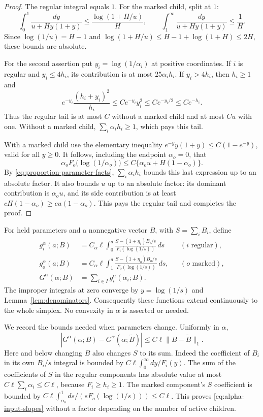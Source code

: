 \begin{proof}
The regular integral equals $1$.  For the marked child, split at $1$:
\[
 \int_0^1\frac{dy}{u+Hy(1+y)}
   \le \frac{\log(1+H/u)}H,
 \qquad
 \int_1^\infty\frac{dy}{u+Hy(1+y)}\le\frac1H.
\]
Since $\log(1/u)=H-1$ and
$\log(1+H/u)\le H-1+\log(1+H)\le2H$, these bounds are absolute.

For the second assertion put $y_i=\log(1/\alpha_i)$ at positive
coordinates.  If $i$ is regular and $y_i\le4h_i$, its contribution
is at most $25\alpha_i h_i$.  If $y_i>4h_i$, then $h_i\ge1$ and
\[
 e^{-y_i}\frac{(h_i+y_i)^2}{h_i}
       \le C e^{-y_i}y_i^2
       \le C e^{-y_i/2}\le C e^{-h_i}.
\]
Thus the regular tail is at most $C$ without a marked child and at
most $Cu$ with one.  Without a marked child,
$\sum_i\alpha_i h_i\ge1$, which pays this tail.

With a marked child use the elementary inequality
$e^{-y}y(1+y)\le C(1-e^{-y})$, valid for all $y\ge0$.
It follows, including the endpoint $\alpha_o=0$, that
\[
 \alpha_o F_o\bigl(\log(1/\alpha_o)\bigr)
       \le C\{\alpha_o u+H(1-\alpha_o)\}.
\]
By \eqref{eq:proportion-parameter-facts},
$\sum_i\alpha_i h_i$ bounds this last expression up to an absolute
factor.  It also bounds $u$ up to an absolute factor: its dominant
contribution is $\alpha_o u$, and its side contribution is at least
$cH(1-\alpha_o)\ge cu(1-\alpha_o)$.  This pays the regular tail
and completes the proof.
\end{proof}

For held parameters and a nonnegative vector $B$, with
$S=\sum_i B_i$, define
\begin{equation}\label{eq:alpha-primitive}
\begin{aligned}
 g_i^\alpha(a;B)
   &=C_\alpha\ell\int_0^a
       \frac{S-(1+\eta_i)B_i/s}{F_i(\log(1/s))}\,ds
       &&(i\text{ regular}),\\
 g_o^\alpha(a;B)
   &=C_\alpha\ell\int_1^a
       \frac{S-(1+\eta_o)B_o/s}{F_o(\log(1/s))}\,ds,
       &&(o\text{ marked}),\\
 G^\alpha(\alpha;B)&=\sum_{i\in I}g_i^\alpha(\alpha_i;B).
\end{aligned}
\end{equation}
The improper integrals at zero converge by
$y=\log(1/s)$ and Lemma~\ref{lem:denominators}.
Consequently these functions extend continuously to the whole
simplex.  No convexity in $\alpha$ is asserted or needed.

We record the bounds needed when parameters change.  Uniformly in
$\alpha$,
\begin{equation}\label{eq:alpha-input-slopes}
 |G^\alpha(\alpha;B)-G^\alpha(\alpha;\widetilde B)|
       \le C\ell\|B-\widetilde B\|_1.
\end{equation}
Here and below changing $B$ also changes $S$ to its sum.  Indeed the
coefficient of $B_i$ in its own $B_i/s$ integral is bounded by
$C\ell\int_0^\infty dy/F_i(y)$.  The sum of the coefficients of
$S$ in the regular components has absolute value at most
$C\ell\sum_i\alpha_i\le C\ell$, because $F_i\ge h_i\ge1$.
The marked component's $S$ coefficient is bounded by
$C\ell\int_{\alpha_o}^1 ds/(sF_o(\log(1/s)))\le C\ell$.
This proves \eqref{eq:alpha-input-slopes} without a factor depending
on the number of active children.

